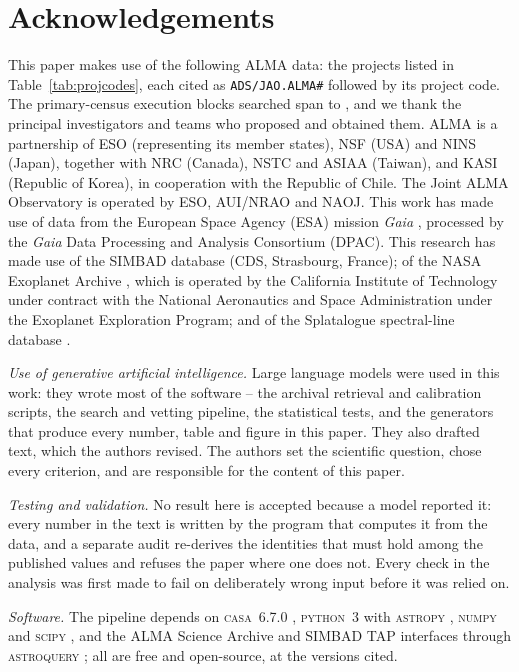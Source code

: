 \section*{Acknowledgements}
This paper makes use of the following ALMA data: the \NProjCodes{} projects
listed in Table~\ref{tab:projcodes}, each cited as \texttt{ADS/JAO.ALMA\#}
followed by its project code. The \NEB{} primary-census execution blocks
searched span \PrEbDateFirst{} to \PrEbDateLast{}, and we thank the principal
investigators and teams who proposed and obtained
them.\ProjCodeUnresClause{} ALMA is a partnership of ESO
(representing its member states), NSF (USA) and NINS (Japan), together with NRC
(Canada), NSTC and ASIAA (Taiwan), and KASI (Republic of Korea), in cooperation
with the Republic of Chile. The Joint ALMA Observatory is operated by ESO,
AUI/NRAO and NAOJ. This work has made use of data from the European Space
Agency (ESA) mission {\it Gaia} \citep{GaiaDR3}, processed by the {\it Gaia}
Data Processing and Analysis Consortium (DPAC). This research has made use
of the SIMBAD database \citep{SIMBAD2000} (CDS, Strasbourg, France); of the
NASA Exoplanet Archive \citep{NEA2013}, which is operated by the California
Institute of Technology under contract with the National Aeronautics and
Space Administration under the Exoplanet Exploration Program; and of the
Splatalogue spectral-line database \citep{Splatalogue2007}.

\emph{Use of generative artificial intelligence.} Large language models were
used in this work: they wrote most of the software -- the archival retrieval and
calibration scripts, the search and vetting pipeline, the statistical tests,
and the generators that produce every number, table and figure in this paper.
They also drafted text, which the authors revised. The authors set the
scientific question, chose every criterion, and are responsible for the content
of this paper.

\emph{Testing and validation.} No result here is accepted because a model
reported it: every number in the text is written by the program that computes it from the
data, and a separate audit re-derives the identities that must hold among the
published values and refuses the paper where one does not. Every check in the
analysis was first made to fail on deliberately wrong input before it was
relied on.

\emph{Software.} The pipeline depends on \textsc{casa}~6.7.0
\citep{CASA2022}, \textsc{python}~3 with \textsc{astropy} \citep{Astropy2022}, \textsc{numpy}
\citep{Harris2020} and \textsc{scipy} \citep{Virtanen2020}, and the ALMA Science
Archive and SIMBAD TAP interfaces through \textsc{astroquery} \citep{Ginsburg2019};
all are free and open-source, at the versions cited.

